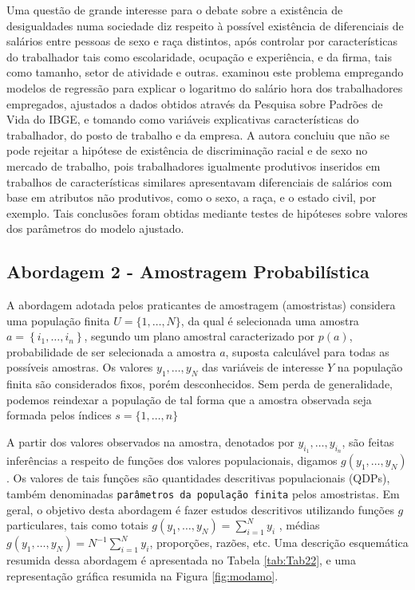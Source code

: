 \documentclass[]{book}
\theoremstyle{definition}
\theoremstyle{definition}
\theoremstyle{definition}
\theoremstyle{remark}
\begin{document}
Uma questão de grande interesse para o debate sobre a existência de
desigualdades numa sociedade diz respeito à possível existência de
diferenciais de salários entre pessoas de sexo e raça distintos, após
controlar por características do trabalhador tais como escolaridade,
ocupação e experiência, e da firma, tais como tamanho, setor de
atividade e outras. \citep{Rodrigues} examinou este problema empregando
modelos de regressão para explicar o logaritmo do salário hora dos
trabalhadores empregados, ajustados a dados obtidos através da Pesquisa
sobre Padrões de Vida do IBGE, e tomando como variáveis explicativas
características do trabalhador, do posto de trabalho e da empresa. A
autora concluiu que não se pode rejeitar a hipótese de existência de
discriminação racial e de sexo no mercado de trabalho, pois
trabalhadores igualmente produtivos inseridos em trabalhos de
características similares apresentavam diferenciais de salários com base
em atributos não produtivos, como o sexo, a raça, e o estado civil, por
exemplo. Tais conclusões foram obtidas mediante testes de hipóteses
sobre valores dos parâmetros do modelo ajustado.

\subsection{Abordagem 2 - Amostragem
Probabilística}\label{abordagem-2---amostragem-probabilistica}

A abordagem adotada pelos praticantes de amostragem (amostristas)
considera uma população finita \(U=\{1,\ldots ,N\}\), da qual é
selecionada uma amostra \(a=\left\{ i_{1},\ldots ,i_{n}\right\}\),
segundo um plano amostral caracterizado por \(p\left( a\right)\),
probabilidade de ser selecionada a amostra \(a\), suposta calculável
para todas as possíveis amostras. Os valores \(y_{1},\ldots ,y_{N}\) das
variáveis de interesse \(Y\) na população finita são considerados fixos,
porém desconhecidos. Sem perda de generalidade, podemos reindexar a
população de tal forma que a amostra observada seja formada pelos
índices \(s=\{1,\ldots,n\}\) \textbar{}

A partir dos valores observados na amostra, denotados por
\(y_{i_{1}},\ldots,y_{i_{n}}\), são feitas inferências a respeito de
funções dos valores populacionais, digamos
\(g\left( y_{1},\ldots ,y_{N}\right)\). Os valores de tais funções são
quantidades descritivas populacionais (QDPs), também denominadas
\texttt{parâmetros\ da\ população\ finita} pelos amostristas. Em geral,
o objetivo desta abordagem é fazer estudos descritivos utilizando
funções \(g\) particulares, tais como totais
\(g\left( y_{1},\ldots ,y_{N}\right) =\sum_{i=1}^{N}y_{i}\) , médias
\(g\left( y_{1},\ldots ,y_{N}\right) =N^{-1}\sum_{i=1}^{N}y_{i}\),
proporções, razões, etc. Uma descrição esquemática resumida dessa
abordagem é apresentada no Tabela \ref{tab:Tab22}, e uma representação
gráfica resumida na Figura \ref{fig:modamo}.
\end{document}

